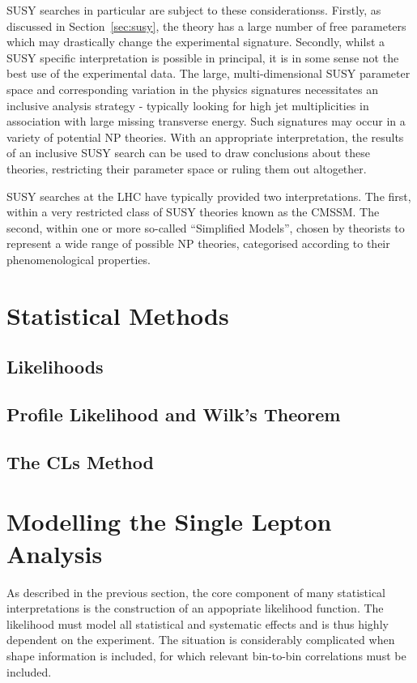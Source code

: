 \ac{SUSY} searches in particular are subject to these
considerationss. Firstly, as discussed in Section~\ref{sec:susy}, the theory
has a large number of free parameters which may drastically change the
experimental signature. Secondly, whilst a \ac{SUSY} specific interpretation is
possible in principal, it is in some sense not the best use of the experimental
data. The large, multi-dimensional \ac{SUSY} parameter space and corresponding
variation in the physics signatures necessitates an inclusive analysis
strategy - typically looking for high jet multiplicities in association with
large missing transverse energy. Such signatures may occur in a variety of
potential \ac{NP} theories. With an appropriate interpretation, the results of
an inclusive \ac{SUSY} search can be used to draw conclusions about these
theories, restricting their parameter space or ruling them out altogether.

\ac{SUSY} searches at the \ac{LHC} have typically provided two
interpretations. The first, within a very restricted class of \ac{SUSY} theories
known as the \ac{CMSSM}. The second, within one or more so-called ``Simplified
Models'', chosen by theorists to represent a wide range of possible \ac{NP}
theories, categorised according to their phenomenological properties.

\section{Statistical Methods}
\subsection{Likelihoods}
\subsection{Profile Likelihood and Wilk's Theorem}
\subsection{The \ac{CLs} Method}
\label{sec:inter_cls}

\section{Modelling the Single Lepton Analysis}
As described in the previous section, the core component of many statistical
interpretations is the construction of an appopriate likelihood function. The
likelihood must model all statistical and systematic effects and is thus highly
dependent on the experiment. The situation is considerably complicated when
shape information is included, for which relevant bin-to-bin correlations must
be included.


